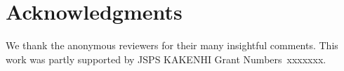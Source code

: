 \section*{Acknowledgments}
We thank the anonymous reviewers for their many insightful comments.
This work was partly supported by JSPS KAKENHI Grant Numbers~xxxxxxx.
